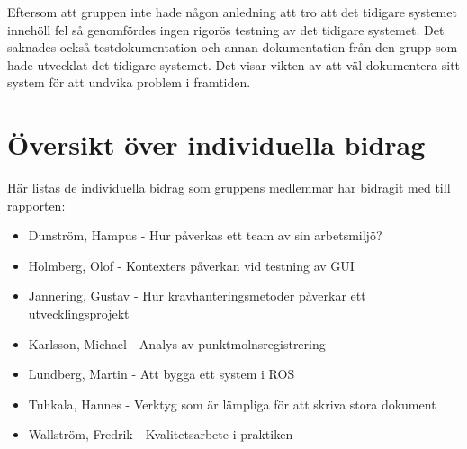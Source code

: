 Eftersom att gruppen inte hade någon anledning att tro att det tidigare systemet innehöll fel så genomfördes ingen rigorös testning av det tidigare systemet. Det saknades också testdokumentation och  annan dokumentation från den grupp som hade utvecklat det tidigare systemet. Det visar vikten av att väl dokumentera sitt system för att undvika problem i framtiden.


\section{Översikt över individuella bidrag}

Här listas de individuella bidrag som gruppens medlemmar har bidragit med till rapporten:

\begin{itemize}
	\item Dunström, Hampus - Hur påverkas ett team av sin arbetsmiljö?
	\item Holmberg, Olof - Kontexters påverkan vid testning av GUI
	\item Jannering, Gustav - Hur kravhanteringsmetoder påverkar ett utvecklingsprojekt
	\item Karlsson, Michael - Analys av punktmolnsregistrering
	\item Lundberg, Martin - Att bygga ett system i ROS
	\item Tuhkala, Hannes - Verktyg som är lämpliga för att skriva stora dokument
	\item Wallström, Fredrik - Kvalitetsarbete i praktiken
\end{itemize}


